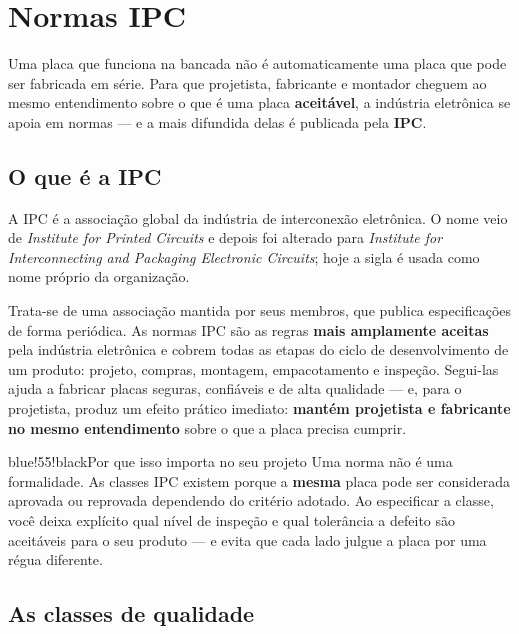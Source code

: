 \hypertarget{normas-ipc}{%
\section{Normas IPC}\label{normas-ipc}}

Uma placa que funciona na bancada não é automaticamente uma placa que pode ser fabricada em série. Para que projetista, fabricante e montador cheguem ao mesmo entendimento sobre o que é uma placa \textbf{aceitável}, a indústria eletrônica se apoia em normas --- e a mais difundida delas é publicada pela \textbf{IPC}.

\hypertarget{o-que-uxe9-a-ipc}{%
\subsection{O que é a IPC}\label{o-que-uxe9-a-ipc}}

A IPC é a associação global da indústria de interconexão eletrônica. O nome veio de \emph{Institute for Printed Circuits} e depois foi alterado para \emph{Institute for Interconnecting and Packaging Electronic Circuits}; hoje a sigla é usada como nome próprio da organização.

Trata-se de uma associação mantida por seus membros, que publica especificações de forma periódica. As normas IPC são as regras \textbf{mais amplamente aceitas} pela indústria eletrônica e cobrem todas as etapas do ciclo de desenvolvimento de um produto: projeto, compras, montagem, empacotamento e inspeção. Segui-las ajuda a fabricar placas seguras, confiáveis e de alta qualidade --- e, para o projetista, produz um efeito prático imediato: \textbf{mantém projetista e fabricante no mesmo entendimento} sobre o que a placa precisa cumprir.

\begin{quadro}{blue!55!black}{Por que isso importa no seu projeto}
Uma norma não é uma formalidade. As classes IPC existem porque a
\textbf{mesma} placa pode ser considerada aprovada ou reprovada
dependendo do critério adotado. Ao especificar a classe, você deixa
explícito qual nível de inspeção e qual tolerância a defeito são
aceitáveis para o seu produto --- e evita que cada lado julgue a placa
por uma régua diferente.
\end{quadro}

\hypertarget{as-classes-de-qualidade}{%
\subsection{As classes de qualidade}\label{as-classes-de-qualidade}}

